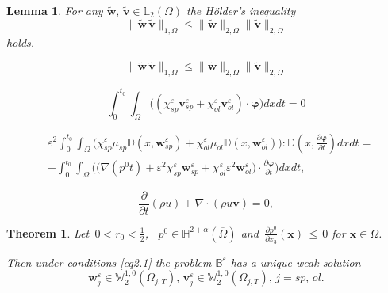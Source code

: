 \documentclass[10pt,a4paper]{amsart}
\newtheorem{lemma}{Lemma}
\newtheorem{theorem}{Theorem}
\begin{document}
\begin{lemma}\label{l2.10}
For any $\widetilde{\boldsymbol{w}},\,\widetilde{\boldsymbol{v}}\in\mathbb{L}_{2}(\Omega)$ the H\"{o}lder's inequality  
\begin{equation}\label{eq2.9}
\|\widetilde{\boldsymbol{w}}\,\widetilde{\boldsymbol{v}}\|_{1,\Omega}\leqslant
\|\widetilde{\boldsymbol{w}}\|_{2,\Omega}\|\widetilde{\boldsymbol{v}}\|_{2,\Omega}
\end{equation}
holds.
\end{lemma}

\begin{equation}
\|\widetilde{\boldsymbol{w}}\,\widetilde{\boldsymbol{v}}\|_{1,\Omega}\leqslant
\|\widetilde{\boldsymbol{w}}\|_{2,\Omega}\|\widetilde{\boldsymbol{v}}\|_{2,\Omega}
\end{equation}

\begin{equation}\label{eq2.19}
\int_{0}^{t_{0}}\int_{\Omega}\big((\chi^{\varepsilon}_{sp}
\boldsymbol{v}^{\varepsilon}_{sp}+\chi^{\varepsilon}_{ol}
\boldsymbol{v}^{\varepsilon}_{ol})\cdot\boldsymbol{\varphi}\big)dxdt=0
\end{equation}

\begin{equation}\label{eq2.20}
\begin{aligned}
& 
\varepsilon^{2}\int_{0}^{t_{0}}\int_{\Omega}\big(\chi^{\varepsilon}_{sp}\mu_{sp}
\mathbb{D}(x,\boldsymbol{w}^{\varepsilon}_{sp})+\chi^{\varepsilon}_{ol}\mu_{ol}
\mathbb{D}(x,\boldsymbol{w}^{\varepsilon}_{ol})\big):
\mathbb{D}(x,\frac{\partial\boldsymbol{\varphi}}{\partial{t}})dxdt=
\\
& -\int_{0}^{t_{0}}\int_{\Omega}\Big(\big(\nabla({p}^{0}t)+\varepsilon^{2}
\chi^{\varepsilon}_{sp}\boldsymbol{w}^{\varepsilon}_{sp}+\chi^{\varepsilon}_{ol}
\varepsilon^{2}\boldsymbol{w}^{\varepsilon}_{ol}\big)
\cdot\frac{\partial\boldsymbol{\varphi}}{\partial{t}}\Big)dxdt,
\end{aligned}
\end{equation}

\begin{equation}\label{eq2.22}
\frac{\partial}{\partial{t}}(\rho{u})+\nabla\cdot(\rho{u}\boldsymbol{v})=0,
\end{equation}

\begin{theorem}\label{t3.1}
Let $\displaystyle\,0<r_{0}<\frac{1}{2}$, \, ${p}^{0}\in\mathbb{H}^{2+\alpha}(\overline{\Omega})$ and
$\displaystyle\,\frac{\partial{p^{0}}}{\partial{x}_{3}}(\boldsymbol{x})\,\leqslant\,0$
for $\boldsymbol{x}\in\Omega$.

Then under conditions \eqref{eq2.1} the problem $\mathbb{B}^{\varepsilon}$ has a unique weak solution
\begin{equation}\label{eq3.1}
\boldsymbol{w}^{\varepsilon}_{j}\in\mathbb{W}^{1,0}_{2}(\Omega_{j,T}),\,\boldsymbol{v}^{\varepsilon}_{j}
\in\mathbb{W}^{1,0}_{2}(\Omega_{j,T}),\,j=sp,\,ol.
\end{equation}
\end{theorem}
\end{document}
